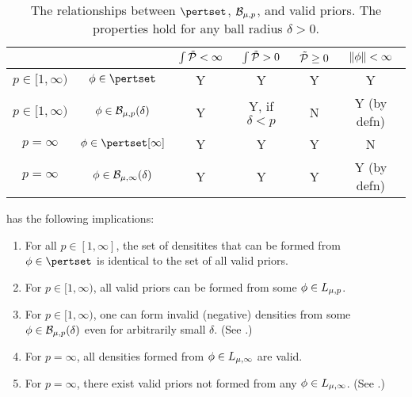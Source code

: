 \begin{thm}
\begin{table}[h!]
\begin{centering}
\begin{tabular}{cccccc}
    && $\int \tilde{\mathcal{P}} < \infty$
    & $\int \tilde{\mathcal{P}} > 0$
    & $\tilde{\mathcal{P}} \ge 0$
    & $\left\Vert\phi\right\Vert < \infty$\\[0.5em] \hline
$p \in [1, \infty)$   &     $\phi \in \pertset$ &
    Y & Y & Y & Y \\ \hline
$p \in [1, \infty)$   &     $\phi \in \mathcal{B}_{\mu,p}(\delta)$ &
    Y & Y, if $\delta < p$ & N & Y (by defn) \\ \hline
$p = \infty$   &     $\phi \in \pertset[\infty]$ &
    Y & Y & Y & N \\ \hline
$p = \infty$   &     $\phi \in \mathcal{B}_{\mu,\infty}(\delta)$ &
    Y & Y & Y & Y (by defn) \\ \hline
\end{tabular}
\caption{The relationships between $\pertset$, $\mathcal{B}_{\mu,p}$, and valid priors.
The properties hold for any ball radius $\delta > 0$.}
\end{centering}
\end{table}

 has the following implications:

\begin{enumerate}
%
\item {}
For all $p \in [1, \infty]$, the set of densitites that can be formed from
$\phi \in \pertset$ is identical to the set of all valid priors.
%
\item {}
For $p \in [1, \infty)$, all valid priors can be formed from
some $\phi \in {L_{\mu,p}}$.
%
\item {}
For $p \in [1, \infty)$, one can form invalid (negative) densities from
some $\phi \in \mathcal{B}_{\mu,p}(\delta)$ even for arbitrarily small $\delta$.
(See .)
%
\item {}
For $p = \infty$, all densities formed from
$\phi \in {L_{\mu,\infty}}$ are valid.
%
\item {}
For $p = \infty$, there exist valid priors not formed from any
$\phi \in {L_{\mu,\infty}}$.  (See .)
%
\end{enumerate}

%
\end{thm}

